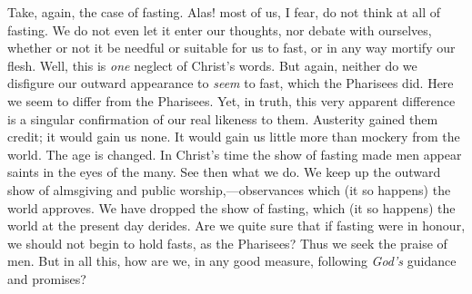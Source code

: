 Take, again, the case of fasting. Alas! most of us, I
fear, do not think at all of fasting. We do not even let
it enter our thoughts, nor debate with ourselves, whether
or not it be needful or suitable for us to fast, or in
any way mortify our flesh. Well, this is \emph{one}
neglect of Christ's words. But again, neither do we
disfigure our outward appearance to \emph{seem} to fast,
which the Pharisees did. Here we seem to differ from the
Pharisees. Yet, in truth, this very apparent difference
is a singular confirmation of our real likeness to them.
Austerity gained them credit; it would gain us none. It
would gain us little more than mockery from the world.
The age is changed. In Christ's time the show of fasting
made men appear saints in the eyes of the many. See then
what we do. We keep up the outward show of almsgiving and
public worship,—observances which (it so happens)
the world approves. We have dropped the show of fasting,
which (it so happens) the world at the present day
derides. Are we quite sure that if fasting were in
honour, we should not begin to hold fasts, as the
Pharisees? Thus we seek the praise of men. But in all
this, how are we, in any good measure, following \emph{God's}
guidance and promises?

